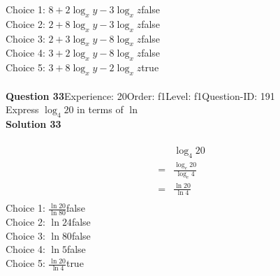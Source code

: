 \documentclass{article}
\begin{document}
Choice 1: \hspace{20pt}$8+2\log_{x}y-3\log_{x}z$\hspace{20pt}false\\
Choice 2: \hspace{20pt}$2+8\log_{x}y-3\log_{x}z$\hspace{20pt}false\\
Choice 3: \hspace{20pt}$2+3\log_{x}y-8\log_{x}z$\hspace{20pt}false\\
Choice 4: \hspace{20pt}$3+2\log_{x}y-8\log_{x}z$\hspace{20pt}false\\
Choice 5: \hspace{20pt}$3+8\log_{x}y-2\log_{x}z$\hspace{20pt}true\\
\\[4pt]
\noindent\textbf{Question 33}\hspace{20pt}Experience: 20\hspace{20pt}Order: f1\hspace{20pt}Level: f1\hspace{20pt}Question-ID: 191\\[2pt]
Express $\log_{4}20$ in terms of $\ln$\\[4pt]
\noindent\textbf{Solution 33}\\[2pt]
\\[-35pt]\begin{align*}
&\log_{4}20\\[2pt]
=&\displaystyle\frac{\log_{e}20}{\log_{e}4}\\[2pt]
=&\displaystyle\frac{\ln20}{\ln4}\\[-100pt]
\end{align*}
Choice 1: \hspace{20pt}$\displaystyle\frac{\ln20}{\ln80}$\hspace{20pt}false\\
Choice 2: \hspace{20pt}$\ln{24}$\hspace{20pt}false\\
Choice 3: \hspace{20pt}$\ln{80}$\hspace{20pt}false\\
Choice 4: \hspace{20pt}$\ln{5}$\hspace{20pt}false\\
Choice 5: \hspace{20pt}$\displaystyle\frac{\ln20}{\ln4}$\hspace{20pt}true\\
\end{document}
